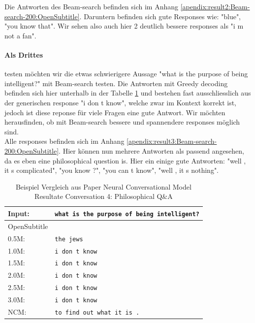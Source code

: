 Die Antworten des Beam-search befinden sich im Anhang \ref{apendix:result2:Beam-search-200:OpenSubtitle}. Daruntern befinden sich gute Responses wie: "blue", "you know that". Wir sehen also auch hier 2 deutlich bessere responses als "i m not a fan".

\paragraph{Als Drittes} testen möchten wir die etwas schwierigere Aussage "what is the purpose of being intelligent?" mit Beam-search testen.
Die Antworten mit Greedy decoding befinden sich hier unterhalb in der Tabelle \ref{results:example20_output:OpenSubtitle} und bestehen fast ausschliesslich aus der generischen response "i don t know", welche zwar im Kontext korrekt ist, jedoch ist diese reponse für viele Fragen eine gute Antwort. 
Wir möchten herausfinden, ob mit Beam-search bessere und spannendere responses möglich sind.\\

Alle responses befinden sich im Anhang \ref{apendix:result3:Beam-search-200:OpenSubtitle}. Hier können nun mehrere Antworten als passend angesehen, da es eben eine philosophical question is. Hier ein einige gute Antworten:  "well , it s complicated", "you know ?", "you can t know", "well , it s nothing".

\begin{table}[H]
	\centering
	\begin{adjustbox}{max width=\textwidth}
		\begin{tabular}{ll}
			\toprule
			Input: 	& \texttt{what is the purpose of being intelligent?}\\
			\midrule
			OpenSubtitle\\
			0.5M: 	& \texttt{the jews}\\
			1.0M: 	& \texttt{i don t know}\\
			1.5M:	& \texttt{i don t know}\\
			2.0M:	& \texttt{i don t know}\\
			2.5M:	& \texttt{i don t know}\\
			3.0M:	& \texttt{i don t know}\\
			\midrule
			NCM:	& \texttt{to find out what it is .}\\
			\bottomrule
		\end{tabular}
	\end{adjustbox}
	\caption{Beispiel Vergleich aus Paper Neural Conversational Model Resultate Conversation 4: Philosophical Q\&A}
	\label{results:example20_output:OpenSubtitle}
\end{table}

